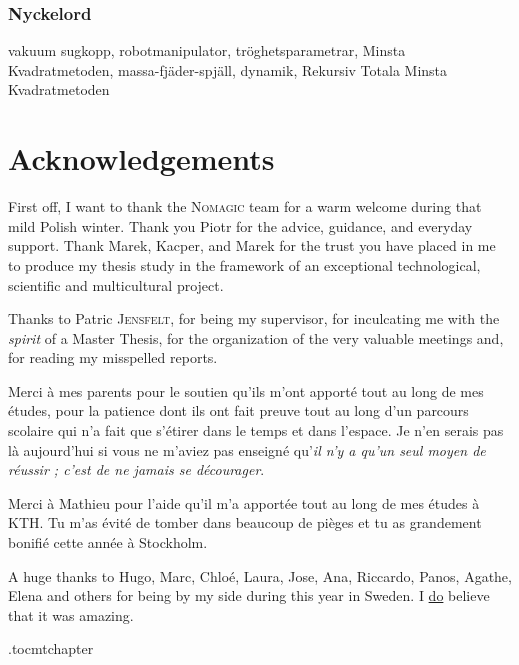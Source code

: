 \documentclass[/home/francois/latex/report/main.tex]{subfiles}
\begin{document}
\subsection*{Nyckelord}

vakuum sugkopp, robotmanipulator, tröghetsparametrar, Minsta Kvadratmetoden, massa-fjäder-spjäll, dynamik, Rekursiv Totala Minsta Kvadratmetoden

\newpage
\thispagestyle{plain}
\chapter*{Acknowledgements}

First off, I want to thank the \textsc{Nomagic} team for a warm welcome during that mild Polish winter. Thank you Piotr for the advice, guidance, and everyday support. Thank Marek, Kacper, and Marek for the trust you have placed in me to produce my thesis study in the framework of an exceptional technological, scientific and multicultural project.

Thanks to Patric \textsc{Jensfelt}, for being my supervisor, for inculcating me with the \textit{spirit} of a Master Thesis, for the organization of the very valuable meetings and, for reading my misspelled reports.

Merci à mes parents pour le soutien qu'ils m'ont apporté tout au long de mes études, pour la patience dont ils ont fait preuve tout au long d'un parcours scolaire qui n'a fait que s'étirer dans le temps et dans l'espace. Je n'en serais pas là aujourd'hui si vous ne m'aviez pas enseigné qu'\textit{il n'y a qu'un seul moyen de réussir ; c'est de ne jamais se décourager}.

Merci à Mathieu pour l'aide qu'il m'a apportée tout au long de mes études à KTH. Tu m'as évité de tomber dans beaucoup de pièges et tu as grandement bonifié cette année à Stockholm.

A huge thanks to Hugo, Marc, Chloé, Laura, Jose, Ana, Riccardo, Panos, Agathe, Elena and others for being by my side during this year in Sweden. I \underline{do} believe that it was amazing.

\newpage



\newpage

\etocdepthtag.toc{mtchapter}
\thispagestyle{plain}
\tableofcontents

\newpage
\end{document}
